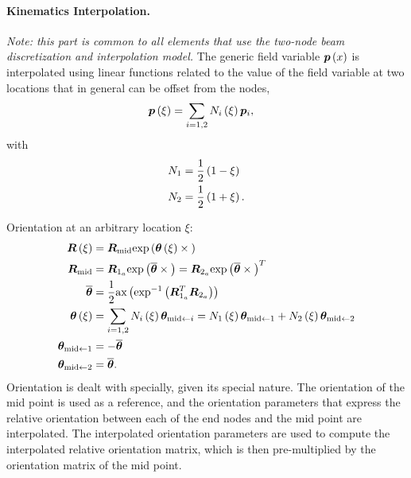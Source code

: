 \paragraph{Kinematics Interpolation.}
\emph{Note: this part is common to all elements that use the
two-node beam discretization and interpolation model.}
The generic field variable $\bm{p}\left( x \right)$ is interpolated
using linear functions related to the value of the field 
variable at two locations that in general can be offset
from the nodes,
\begin{align}
	\bm{p}\left( \xi \right)
	&=
	\sum_{i=1,2} N_i\left( \xi \right) \bm{p}_i
	,
\end{align}
with
\begin{subequations}
\label{eq:aero:beam2:N}
\begin{align}
	N_1 &= \frac{1}{2} \left( 1 - \xi \right)
	\\
	N_2 &= \frac{1}{2} \left( 1 + \xi \right)
	.
\end{align}
\end{subequations}

Orientation at an arbitrary location $\xi$:
\begin{align}
	\bm{R}\left( \xi \right)
	&=
	\bm{R}_{\text{mid}} \text{exp}\left( \bm{\theta}\left( \xi \right)\times{} \right)
	\\
	\bm{R}_{\text{mid}}
	&=
	\bm{R}_{1_a} \text{exp}\left( \overline{\bm{\theta}}\times{} \right)
	= \bm{R}_{2_a} \text{exp}\left( \overline{\bm{\theta}}\times{} \right)^T
	\\
	\overline{\bm{\theta}}
	&=
	\frac{1}{2} \text{ax}\left( \text{exp}^{-1}\left( \bm{R}_{1_a}^T \bm{R}_{2_a} \right) \right)
	\\
	\bm{\theta}\left( \xi \right)
	&=
	\sum_{i=1,2} N_i\left( \xi \right) \bm{\theta}_{\text{mid}\leftarrow i}
	= N_1\left( \xi \right) \bm{\theta}_{\text{mid}\leftarrow 1}
		+ N_2\left( \xi \right) \bm{\theta}_{\text{mid}\leftarrow 2}
	\\
	\bm{\theta}_{\text{mid}\leftarrow 1}
	&= -\overline{\bm{\theta}}
	\\
	\bm{\theta}_{\text{mid}\leftarrow 2}
	&=
	\overline{\bm{\theta}}
	.
\end{align}
Orientation is dealt with specially, given its special nature.
The orientation of the mid point is used as a reference,
and the orientation parameters that express the relative orientation
between each of the end nodes and the mid point are interpolated.
The interpolated orientation parameters are used to compute
the interpolated relative orientation matrix, which is then
pre-multiplied by the orientation matrix of the mid point.


